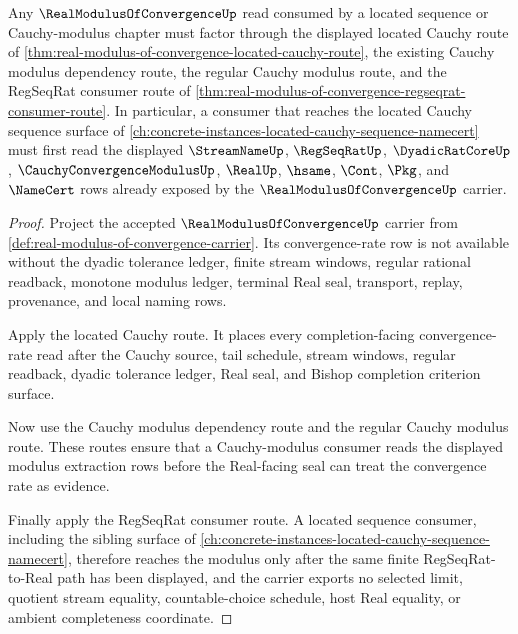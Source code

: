\begin{theorem}
\label{thm:real-modulus-of-convergence-located-sequence-link}
Any $\RealModulusOfConvergenceUp$ read consumed by a located sequence or Cauchy-modulus chapter must factor through the displayed located Cauchy route of \autoref{thm:real-modulus-of-convergence-located-cauchy-route}, the existing Cauchy modulus dependency route, the regular Cauchy modulus route, and the RegSeqRat consumer route of \autoref{thm:real-modulus-of-convergence-regseqrat-consumer-route}. In particular, a consumer that reaches the located Cauchy sequence surface of \autoref{ch:concrete-instances-located-cauchy-sequence-namecert} must first read the displayed $\StreamNameUp$, $\RegSeqRatUp$, $\DyadicRatCoreUp$, $\CauchyConvergenceModulusUp$, $\RealUp$, $\hsame$, $\Cont$, $\Pkg$, and $\NameCert$ rows already exposed by the $\RealModulusOfConvergenceUp$ carrier.
\end{theorem}
\begin{proof}
Project the accepted $\RealModulusOfConvergenceUp$ carrier from \autoref{def:real-modulus-of-convergence-carrier}. Its convergence-rate row is not available without the dyadic tolerance ledger, finite stream windows, regular rational readback, monotone modulus ledger, terminal Real seal, transport, replay, provenance, and local naming rows.

Apply the located Cauchy route. It places every completion-facing convergence-rate read after the Cauchy source, tail schedule, stream windows, regular readback, dyadic tolerance ledger, Real seal, and Bishop completion criterion surface.

Now use the Cauchy modulus dependency route and the regular Cauchy modulus route. These routes ensure that a Cauchy-modulus consumer reads the displayed modulus extraction rows before the Real-facing seal can treat the convergence rate as evidence.

Finally apply the RegSeqRat consumer route. A located sequence consumer, including the sibling surface of \autoref{ch:concrete-instances-located-cauchy-sequence-namecert}, therefore reaches the modulus only after the same finite RegSeqRat-to-Real path has been displayed, and the carrier exports no selected limit, quotient stream equality, countable-choice schedule, host Real equality, or ambient completeness coordinate.
\end{proof}

